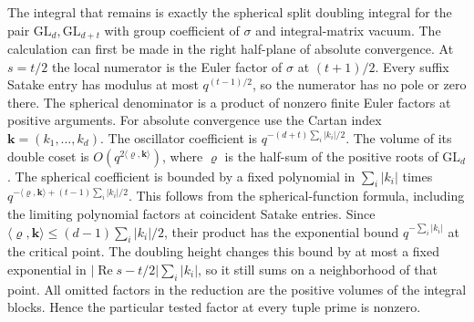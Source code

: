 The integral that remains is exactly the spherical
split doubling integral for the pair
\(\mathrm{GL}_d,\mathrm{GL}_{d+t}\) with group coefficient
of \(\sigma\) and integral-matrix vacuum. The calculation
can first be made in the right half-plane of absolute
convergence. At \(s=t/2\) the local numerator is the
Euler factor of \(\sigma\) at \((t+1)/2\).
Every suffix Satake entry has modulus at most
\(q^{(t-1)/2}\), so the numerator has no pole or
zero there. The spherical denominator is a product
of nonzero finite Euler factors at positive arguments.
For absolute convergence use the Cartan index
\(\mathbf k=(k_1,\ldots,k_d)\). The oscillator
coefficient is \(q^{-(d+t)\sum_i|k_i|/2}\).
The volume of its double coset is
\(O(q^{2\langle\varrho,\mathbf k\rangle})\),
where \(\varrho\) is the half-sum of the positive
roots of \(\mathrm{GL}_d\). The spherical coefficient
is bounded by a fixed polynomial in \(\sum_i|k_i|\)
times
\(q^{-\langle\varrho,\mathbf k\rangle+
                 (t-1)\sum_i|k_i|/2}\).
This follows from the spherical-function formula,
including the limiting polynomial factors at
coincident Satake entries. \cite[Proposition~4.1 and Theorem~4.2]{p2casselman-spherical}
Since
\(\langle\varrho,\mathbf k\rangle\le
(d-1)\sum_i|k_i|/2\), their product has the
exponential bound \(q^{-\sum_i|k_i|}\)
at the critical point. The doubling height changes
this bound by at most a fixed exponential in
\(|\operatorname{Re}s-t/2|\sum_i|k_i|\), so it
still sums on a neighborhood of that point.
All omitted factors
in the reduction are the positive volumes of the
integral blocks. Hence the particular tested factor
at every tuple prime is nonzero.

